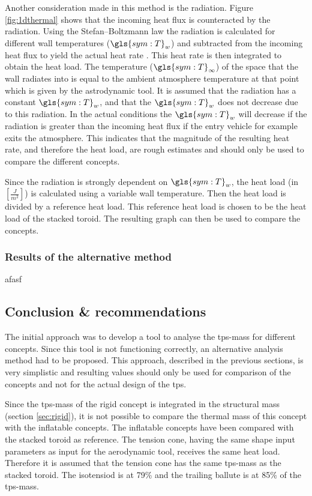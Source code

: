 Another consideration made in this method is the radiation. Figure \ref{fig:1dthermal} shows that the incoming heat flux is counteracted by the radiation. Using the Stefan–Boltzmann law the radiation is calculated for different wall temperatures ($\gls{sym:T}_w$) and subtracted from the incoming heat flux to yield the actual heat rate \cite{Holman2002}. This heat rate is then integrated to obtain the heat load. The temperature ($\gls{sym:T}_\infty$) of the space that the wall radiates into is equal to the ambient atmosphere temperature at that point which is given by the astrodynamic tool. It is assumed that the radiation has a constant $\gls{sym:T}_w$, and that the $\gls{sym:T}_w$ does not decrease due to this radiation. In the actual conditions the $\gls{sym:T}_w$ will decrease if the radiation is greater than the incoming heat flux if the entry vehicle for example exits the atmosphere. This indicates that the magnitude of the resulting heat rate, and therefore the heat load, are rough estimates and should only be used to compare the different concepts.

Since the radiation is strongly dependent on $\gls{sym:T}_w$, the heat load (in $\left[\frac{J}{m^2}\right]$) is calculated using a variable wall temperature. Then the heat load is divided by a reference heat load. This reference heat load is chosen to be the heat load of the stacked toroid. The resulting graph can then be used to compare the concepts.

\subsubsection{Results of the alternative method}
afasf

\subsection{Conclusion \& recommendations}
The initial approach was to develop a tool to analyse the \gls{tps}-mass for different concepts. Since this tool is not functioning correctly, an alternative analysis method had to be proposed. This approach, described in the previous sections, is very simplistic and resulting values should only be used for comparison of the concepts and not for the actual design of the \gls{tps}.

Since the \gls{tps}-mass of the rigid concept is integrated in the structural mass (section \ref{sec:rigid}), it is not possible to compare the thermal mass of this concept with the inflatable concepts. The inflatable concepts have been compared with the stacked toroid as reference. The tension cone, having the same shape input parameters as input for the aerodynamic tool, receives the same heat load. Therefore it is assumed that the tension cone has the same \gls{tps}-mass as the stacked toroid. The isotensiod is at 79\% and the trailing ballute is at 85\% of the \gls{tps}-mass.

